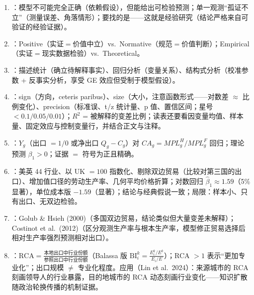 \begin{sumbox}
\begin{enumerate}
  \item {}：模型不可能完全正确（依赖假设），但能给出可检验预测；单一观测``孤证不立''（测量误差、角落情形）；要找的是——这就是经验研究（结论严格来自可验证的经验证据）。
  \item {}：Positive（实证$=$价值中立）vs.\ Normative（规范$=$价值判断）；Empirical（实证$=$现实数据检验）vs.\ Theoretical。
  \item {}：描述统计（确立待解释事实）、回归分析（变量关系）、结构式分析（校准参数 + 反事实分析，享受 GE 效应但受制于模型假设）。
  \item {}：sign（方向，ceteris paribus）、size（大小，注意函数形式——对数差 $\approx$ 比例变化）、precision（标准误、t/z 统计量、p 值、置信区间；星号 $<0.1/0.05/0.01$）；$R^2$ = 被解释的变差比例；读表还要看因变量均值、样本量、固定效应与控制变量行，并结合正文与注释。
  \item {}：$Y_g$（出口 $=1/0$ 或净出口 $Q_g - C_g$）对 $CA_g = MPL_g^H / MPL_g^F$ 回归；理论预测 $\beta_1 > 0$；证据 $=$ 符号为正且精确。
  \item {}：美英 44 行业、以 UK $= 100$ 指数化、剔除双边贸易（比较对第三国的出口）、增加值口径的劳动生产率、几何平均价格折算；对数回归 $\hat\beta_1 \approx 1.59$（5\% 显著），单位成本版 $-1.59$（显著）；结论与经典假说一致；局限：样本小、只有出口、无双边检验。
  \item {}：Golub \& Hsieh (2000)（多国双边贸易，结论类似但大量变差未解释）；Costinot et al.\ (2012)（区分观测生产率与根本生产率，模型修正贸易选择后相对生产率强烈预测相对出口）。
  \item {}：$\text{RCA} = \frac{\text{本地出口中行业份额}}{\text{参照出口中行业份额}}$（Balassa 版 $\mathrm{BI}_i^k = \frac{E_i^k/E^k}{E_i/E}$）；RCA $> 1$ 表示``更加专业化''；出口规模 $\neq$ 专业化程度。应用（Lin et al.\ 2024）：来源城市的 RCA 刻画领导人的行业暴露，目的地城市的 RCA 动态刻画行业变化——知识扩散随政治轮换传播的机制证据。
\end{enumerate}
\end{sumbox}
